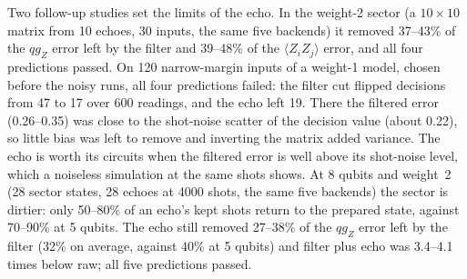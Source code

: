 \documentclass[11pt]{article}
\newcommand{\qZ}{qg_Z}
\begin{document}
Two follow-up studies set the limits of the echo. In the weight-2 sector (a $10\times10$ matrix from 10 echoes, 30
inputs, the same five backends) it removed 37--43\% of the $\qZ$ error left by the filter and 39--48\% of the
$\langle Z_iZ_j\rangle$ error, and all four predictions passed. On 120 narrow-margin inputs of a weight-1 model, chosen
before the noisy runs, all four predictions failed: the filter cut flipped decisions from 47 to 17 over 600 readings,
and the echo left 19. There the filtered error (0.26--0.35) was close to the shot-noise scatter of the decision value
(about 0.22), so little bias was left to remove and inverting the matrix added variance. The echo is worth its circuits
when the filtered error is well above its shot-noise level, which a noiseless simulation at the same shots shows.
At 8 qubits and weight~2 (28 sector states, 28 echoes at 4000 shots, the same five backends) the sector is dirtier:
only 50--80\% of an echo's kept shots return to the prepared state, against 70--90\% at 5 qubits. The echo still
removed 27--38\% of the $\qZ$ error left by the filter (32\% on average, against 40\% at 5 qubits) and filter plus
echo was 3.4--4.1 times below raw; all five predictions passed.
\end{document}

